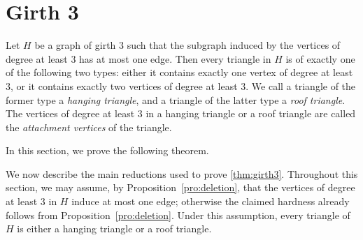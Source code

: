 \documentclass[a4paper,UKenglish,cleveref, autoref, thm-restate]{lipics-v2021}
\begin{document}

\section{Girth 3}
\label{sec:girth3}

Let $H$ be a graph of girth $3$ such that the subgraph induced by the vertices of degree at least $3$ has at most one edge.
Then every triangle in $H$ is of exactly one of the following two types:
either it contains exactly one vertex of degree at least $3$, or it contains exactly two vertices of degree at least $3$.
We call a triangle of the former type a \emph{hanging triangle}, and a triangle of the latter type a \emph{roof triangle}.
The vertices of degree at least $3$ in a hanging triangle or a roof triangle are called the \emph{attachment vertices} of the triangle.

In this section, we prove the following theorem.

\GirthThreeTheorem*

We now describe the main reductions used to prove \cref{thm:girth3}.
Throughout this section, we may assume, by Proposition~\ref{pro:deletion}, that the vertices of degree at least $3$ in $H$ induce at most one edge; otherwise the claimed hardness already follows from Proposition~\ref{pro:deletion}.
Under this assumption, every triangle of $H$ is either a hanging triangle or a roof triangle.
\end{document}
